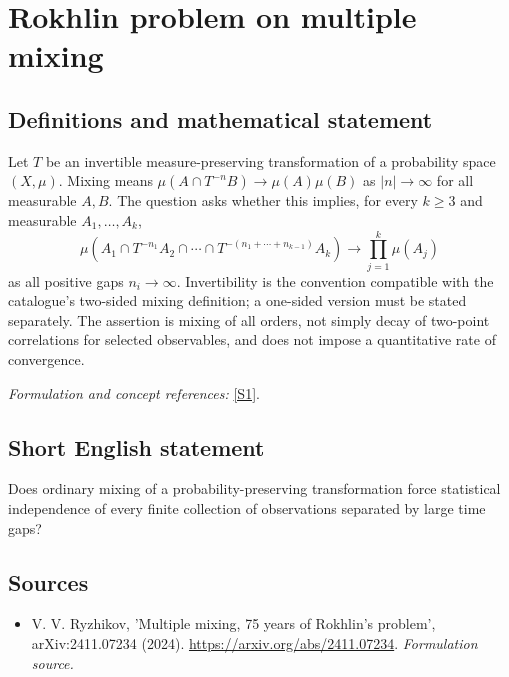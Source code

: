 \documentclass[11pt]{article}
\begin{document}
\section*{\texorpdfstring{Rokhlin problem on multiple mixing}{Rokhlin problem on multiple mixing}}\label{396}
\subsection{Definitions and mathematical statement}
Let $T$ be an invertible measure-preserving transformation of a probability space $(X,\mu)$. Mixing means $\mu(A\cap T^{-n}B)\to\mu(A)\mu(B)$ as $|n|\to\infty$ for all measurable $A,B$. The question asks whether this implies, for every $k\ge3$ and measurable $A_1,\ldots,A_k$,
\[
 \mu\!\left(A_1\cap T^{-n_1}A_2\cap\cdots\cap
 T^{-(n_1+\cdots+n_{k-1})}A_k\right)
 \longrightarrow\prod_{j=1}^k\mu(A_j)
\]
as all positive gaps $n_i\to\infty$. Invertibility is the convention compatible with the catalogue's two-sided mixing definition; a one-sided version must be stated separately. The assertion is mixing of all orders, not simply decay of two-point correlations for selected observables, and does not impose a quantitative rate of convergence.
\par\smallskip\textit{Formulation and concept references:} \href{https://arxiv.org/abs/2411.07234}{[S1]}.

\subsection{Short English statement}
Does ordinary mixing of a probability-preserving transformation force statistical independence of every finite collection of observations separated by large time gaps?
\subsection{Sources}
\begin{itemize}
\item[S1]V. V. Ryzhikov, 'Multiple mixing, 75 years of Rokhlin's problem', arXiv:2411.07234 (2024).
\url{https://arxiv.org/abs/2411.07234}.
\textit{Formulation source.}
\end{itemize}
\end{document}
